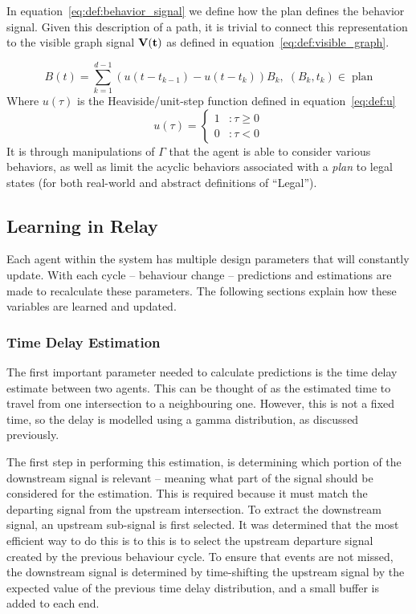 \documentclass{report}
\begin{document}
In equation~\eqref{eq:def:behavior_signal} we define how the plan defines the behavior signal.
Given this description of a path, it is trivial to connect this representation to the visible graph signal $\bf{V}(t)$ as defined in equation~\eqref{eq:def:visible_graph}.

\begin{equation}\label{eq:def:behavior_signal}
	B(t) = \sum_{k=1}^{d-1} (u(t - t_{k-1}) - u(t - t_k)) B_k, \; (B_k, t_k) \in \; \mbox{plan}
\end{equation}
Where $u(\tau)$ is the Heaviside/unit-step function defined in equation~\eqref{eq:def:u}
\begin{equation}\label{eq:def:u}
	u(\tau) = \left\{
		\begin{array}{lr}
			1 & : \tau \geq 0\\
			0 & : \tau < 0
		\end{array}
		\right.
	\end{equation}
It is through manipulations of $\Gamma$ that the agent is able to consider various behaviors, as well as limit the acyclic behaviors associated with a \emph{plan} to legal states (for both real-world and abstract definitions of ``Legal'').

\subsection{Learning in Relay}
\label{sec:learning_in_relay}

Each agent within the system has multiple design parameters that will constantly update. With each cycle -- behaviour change -- predictions and estimations are made to recalculate these parameters. 
The following sections explain how these variables are learned and updated.

\subsubsection{Time Delay Estimation}

The first important parameter needed to calculate predictions is the time delay estimate between two agents. 
This can be thought of as the estimated time to travel from one intersection to a neighbouring one. 
However, this is not a fixed time, so the delay is modelled using a gamma distribution, as discussed previously. 

The first step in performing this estimation, is determining which portion of the downstream signal is relevant – meaning what part of the signal should be considered for the estimation. 
This is required because it must match the departing signal from the upstream intersection. 
To extract the downstream signal, an upstream sub-signal is first selected. It was determined that the most efficient way to do this is to this is to select the upstream departure signal created by the previous behaviour cycle. 
To ensure that events are not missed, the downstream signal is determined by time-shifting the upstream signal by the expected value of the previous time delay distribution, and a small buffer is added to each end.
\end{document}
